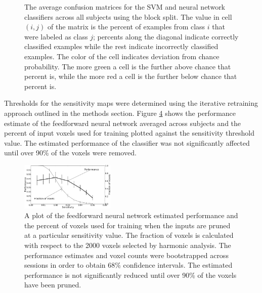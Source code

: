 \documentclass[preprint,5p,authoryear]{elsarticle}
\begin{document}
\begin{figure}
\centering
\begin{subfigure}{0.3\textwidth}
\centering
\begin{adjustbox}{center}

\end{adjustbox}
\caption{}
\label{fig:average-confusion-svm}
\end{subfigure}
\begin{subfigure}{0.3\textwidth}
\centering
\begin{adjustbox}{center}

\end{adjustbox}
\caption{}
\label{fig:average-confusion-nn}
\end{subfigure}
\caption{The average confusion matrices for the  SVM and  neural network classifiers across all subjects using the block split.
The value in cell $(i,j)$ of the matrix is the percent of examples from class $i$ that were labeled as class $j$; percents along the diagonal indicate correctly classified examples while the rest indicate incorrectly classified examples.
The color of the cell indicates deviation from chance probability.
The more green a cell is the further above chance that percent is, while the more red a cell is the further below chance that percent is.}
\label{fig:average-confusion}
\end{figure}

Thresholds for the sensitivity maps were determined using the iterative retraining approach outlined in the methods section.
Figure \ref{fig:sensitivity-cutoff} shows the performance estimate of the feedforward neural network averaged across subjects and the percent of input voxels used for training plotted against the sensitivity threshold value.
The estimated performance of the classifier was not significantly affected until over 90\% of the voxels were removed.

\begin{figure}
\centering
\includegraphics[width=0.4\textwidth]{figures/performance-verse-sensitivity-cutoff}
\caption{A plot of the feedforward neural network estimated performance and the percent of voxels used for training when the inputs are pruned at a particular sensitivity value.
The fraction of voxels is calculated with respect to the 2000 voxels selected by harmonic analysis.
The performance estimates and voxel counts were bootstrapped across sessions in order to obtain 68\% confidence intervals.
The estimated performance is not significantly reduced until over 90\% of the voxels have been pruned.}
\label{fig:sensitivity-cutoff}
\end{figure}
\end{document}

